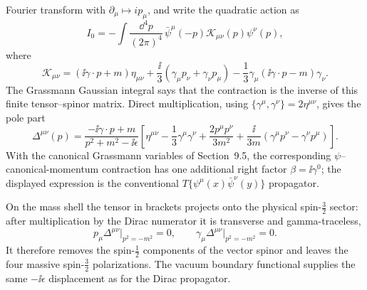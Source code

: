 \begin{enumerate}
Fourier transform with \(\partial_\mu\mapsto ip_\mu\), and write the
quadratic action as
\[
 I_0=-\int\frac{\dd^4p}{(2\pi)^4}\,
 \bar\psi^\mu(-p)\mathcal K_{\mu\nu}(p)\psi^\nu(p),
\]
where
\[
 \mathcal K_{\mu\nu}=
 (\ii\gamma\cdot p+m)\eta_{\mu\nu}
 +\frac{\ii}{3}(\gamma_\mu p_\nu+\gamma_\nu p_\mu)
 -\frac13\gamma_\mu(\ii\gamma\cdot p-m)\gamma_\nu .
\]
The Grassmann Gaussian integral says that the contraction is the inverse
of this finite tensor--spinor matrix.  Direct multiplication, using
\(\{\gamma^\mu,\gamma^\nu\}=2\eta^{\mu\nu}\), gives the pole part
\[
 \boxed{\quad
 \Delta^{\mu\nu}(p)=
 \frac{-\ii\gamma\cdot p+m}{p^2+m^2-\ii\epsilon}
 \left[
 \eta^{\mu\nu}-\frac13\gamma^\mu\gamma^\nu
 +\frac{2p^\mu p^\nu}{3m^2}
 +\frac{\ii}{3m}
   (\gamma^\mu p^\nu-\gamma^\nu p^\mu)
 \right].
 \quad}
\]
With the canonical Grassmann variables of Section~9.5, the corresponding
\(\psi\)--canonical-momentum contraction has one additional right factor
\(\beta=\ii\gamma^0\); the displayed expression is the conventional
\(T\{\psi^\mu(x)\bar\psi^\nu(y)\}\) propagator.

On the mass shell the tensor in brackets projects onto the physical
spin-\(\tfrac32\) sector: after multiplication by the Dirac numerator it
is transverse and gamma-traceless,
\[
 p_\mu\Delta^{\mu\nu}\big|_{p^2=-m^2}=0,
\qquad
 \gamma_\mu\Delta^{\mu\nu}\big|_{p^2=-m^2}=0.
\]
It therefore removes the spin-\(\tfrac12\) components of the vector
spinor and leaves the four massive spin-\(\tfrac32\) polarizations.  The
vacuum boundary functional supplies the same
\(-\ii\epsilon\) displacement as for the Dirac propagator.
\end{enumerate}
